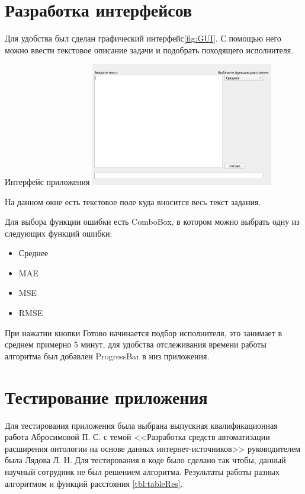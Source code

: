 \documentclass[PI,KR]{HSEUniversity}
\begin{document}
\section{Разработка интерфейсов}
Для удобства был сделан графический интерфейс\ref{fig:GUI}. С помощью него можно ввести текстовое описание задачи и подобрать походящего исполнителя.
\begin{FIGURE}[h]{Интерфейс приложения \label{fig:GUI}}
	\includegraphics[width=0.6\textwidth]{img/GUI}
\end{FIGURE}

На данном окне есть текстовое поле куда вносится весь текст задания.

Для выбора функции ошибки есть ComboBox, в котором можно выбрать одну из следующих функций ошибки:
\begin{itemize}
	\item Среднее
	\item MAE
	\item MSE
	\item RMSE
\end{itemize}

При нажатии кнопки Готово начинается подбор исполнителя, это занимает в среднем примерно 5 минут, для удобства отслеживания времени работы алгоритма был добавлен ProgressBar в низ приложения.

\section{Тестирование приложения}
Для тестирования приложения была выбрана выпускная квалификационная работа Абросимовой П. С. с темой <<Разработка средств автоматизации расширения онтологии на основе данных интернет-источников>> руководителем была Лядова Л. Н. Для тестирования в коде было сделано так чтобы, данный научный сотрудник не был решением алгоритма. Результаты работы разных алгоритмом и функций расстояния \ref{tbl:tableRes}.
\end{document}
